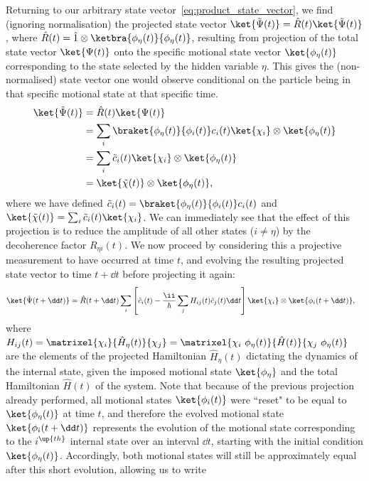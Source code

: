 Returning to our arbitrary state vector~\eqref{eq:product_state_vector}, we find (ignoring normalisation) the projected state vector $\ket{\tilde \Psi(t)} = \hat R(t)\ket{\tilde \Psi(t)}$, where $\hat R(t) = \hat 1 \otimes \ketbra{\phi_\eta(t)}{\phi_\eta(t)}$, resulting from projection of the total state vector $\ket{\Psi(t)}$ onto the specific motional state vector $\ket{\phi_\eta(t)}$ corresponding to the state selected by the hidden variable $\eta$. This gives the (non-normalised) state vector one would observe conditional on the particle being in that specific motional state at that specific time.
\begin{align}
\ket{\tilde \Psi(t)} &= \hat R(t) \ket{\Psi(t)}\\
&= \sum_i\braket{\phi_\eta(t)}{\phi_i(t)}c_i(t)\ket{\chi_i}\otimes\ket{\phi_\eta(t)}\\
&= \sum_i\tilde c_i(t)\ket{\chi_i}\otimes\ket{\phi_\eta(t)}\\
&= \ket{\tilde \chi(t)}\otimes\ket{\phi_\eta(t)},
\end{align}
where we have defined $\tilde c_i(t) = \braket{\phi_\eta(t)}{\phi_i(t)}c_i(t)$ and $\ket{\tilde \chi(t)} = \sum_i \tilde c_i(t)\ket{\chi_i}$. We can immediately see that the effect of this projection is to reduce the amplitude of all other states ($i\neq\eta$) by the decoherence factor $R_{\eta i}(t)$. We now proceed by considering this a projective measurement to have occurred at time $t$, and evolving the resulting projected state vector to time $t+\dd t$ before projecting it again:
\begin{align}\label{eq:second_proj}
\ket{\tilde \Psi(t + \dd t)} &= 
\hat R(t + \dd t)
\sum_i
\left[\tilde c_i(t) - \frac\ii\hbar\sum_j H_{ij}(t)\tilde c_j(t)\dd t\right]
\ket{\chi_i}\otimes\ket{\phi_i(t + \dd t)},
\end{align}
where $H_{ij}(t) = \matrixel{\chi_i}{\hat H_{\eta}(t)}{\chi_j} = \matrixel{\chi_i\ \phi_\eta(t)}{\hat H(t)}{\chi_j\ \phi_\eta(t)}$ are the elements of the projected Hamiltonian $\hat H_\eta(t)$ dictating the dynamics of the internal state, given the imposed motional state $\ket{\phi_\eta}$ and the total Hamiltonian $\hat H(t)$ of the system. Note that because of the previous projection already performed, all motional states $\ket{\phi_i(t)}$ were ``reset" to be equal to $\ket{\phi_\eta(t)}$ at time $t$, and therefore the evolved motional state $\ket{\phi_i(t + \dd t)}$ represents the evolution of the motional state corresponding to the $i^\up{th}$ internal state over an interval $\dd t$, starting with the initial condition $\ket{\phi_\eta(t)}$. Accordingly, both motional states will still be approximately equal after this short evolution, allowing us to write
